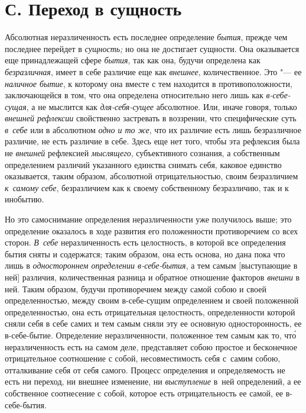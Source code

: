 \section[С. Переход в сущность]{С. Переход в сущность}

Абсолютная неразличенность есть последнее определение {\em бытия}, прежде чем
последнее перейдет в {\em сущность;} но она не достигает сущности. Она
оказывается еще принадлежащей сфере {\em бытия}, так как она, будучи определена
как {\em безразличная}, имеет в себе различие еще как {\em внешнее},
количественное. Это "--- ее {\em наличное бытие}, к которому она вместе с тем
находится в противоположности, заключающейся в том, что она определена
относительно него лишь как {\em в-себе-сущая}, а не мыслится как
{\em для-себя-сущее} абсолютное. Или, иначе говоря, только
{\em внешней рефлексии} свойственно застревать в воззрении, что специфические
суть {\em в~себе} или в абсолютном {\em одно и то же}, что их различие есть
лишь безразличное различие, не есть различие в себе. Здесь еще нет того, чтобы
эта рефлексия была не {\em внешней} рефлексией {\em мыслящего}, субъективного
сознания, а собственным определением различий указанного единства снимать себя,
каковое единство оказывается, таким образом, абсолютной отрицательностью, своим
безразличием {\em к~самому себе}, безразличием как к своему собственному
безразличию, так и к инобытию.

Но это самоснимание определения неразличенности уже получилось выше; это
определение оказалось в ходе развития его положенности противоречием со всех
сторон. {\em В~себе} неразличенность есть целостность, в которой все
определения бытия сняты и содержатся; таким образом, она есть основа, но дана
пока что лишь в {\em одностороннем определении в-себе-бытия}, а тем самым
[выступающие в ней] различия, количественная разница и обратное отношение
факторов {\em внешни} в ней. Таким образом, будучи противоречием между самой
собою и своей определенностью, между своим в-себе-сущим определением и своей
положенной определенностью, она есть отрицательная целостность, определенности
которой сняли себя в себе самих и тем самым сняли эту ее основную
односторонность, ее в-себе-бытие. Определение неразличенности, положенное тем
самым как то, чт\'{о} неразличенность есть на самом деле, представляет собою
простое и бесконечное отрицательное соотношение с собой, несовместимость себя
с~самим собою, отталкивание себя от себя самого. Процесс определения и
определяемость не есть ни переход, ни внешнее изменение, ни {\em выступление}
в~ней определений, а ее собственное соотнесение с собой, которое есть
отрицательность ее самой, ее в-себе-бытия.

